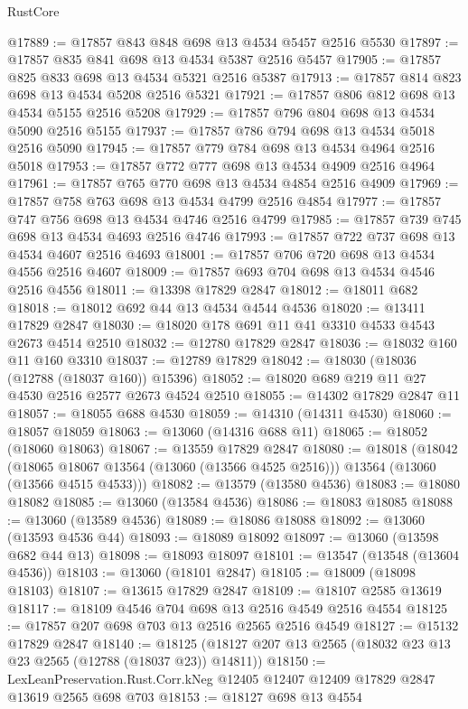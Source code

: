 \begin{lexlean}{RustCore}
\begin{coremodule}
@17889 := @17857 @843 @848 @698 @13 @4534 @5457 @2516 @5530
@17897 := @17857 @835 @841 @698 @13 @4534 @5387 @2516 @5457
@17905 := @17857 @825 @833 @698 @13 @4534 @5321 @2516 @5387
@17913 := @17857 @814 @823 @698 @13 @4534 @5208 @2516 @5321
@17921 := @17857 @806 @812 @698 @13 @4534 @5155 @2516 @5208
@17929 := @17857 @796 @804 @698 @13 @4534 @5090 @2516 @5155
@17937 := @17857 @786 @794 @698 @13 @4534 @5018 @2516 @5090
@17945 := @17857 @779 @784 @698 @13 @4534 @4964 @2516 @5018
@17953 := @17857 @772 @777 @698 @13 @4534 @4909 @2516 @4964
@17961 := @17857 @765 @770 @698 @13 @4534 @4854 @2516 @4909
@17969 := @17857 @758 @763 @698 @13 @4534 @4799 @2516 @4854
@17977 := @17857 @747 @756 @698 @13 @4534 @4746 @2516 @4799
@17985 := @17857 @739 @745 @698 @13 @4534 @4693 @2516 @4746
@17993 := @17857 @722 @737 @698 @13 @4534 @4607 @2516 @4693
@18001 := @17857 @706 @720 @698 @13 @4534 @4556 @2516 @4607
@18009 := @17857 @693 @704 @698 @13 @4534 @4546 @2516 @4556
@18011 := @13398 @17829 @2847
@18012 := @18011 @682
@18018 := @18012 @692 @44 @13 @4534 @4544 @4536
@18020 := @13411 @17829 @2847
@18030 := @18020 @178 @691 @11 @41 @3310 @4533 @4543 @2673 @4514 @2510
@18032 := @12780 @17829 @2847
@18036 := @18032 @160 @11 @160 @3310
@18037 := @12789 @17829
@18042 := @18030 (@18036 (@12788 (@18037 @160)) @15396)
@18052 := @18020 @689 @219 @11 @27 @4530 @2516 @2577 @2673 @4524 @2510
@18055 := @14302 @17829 @2847 @11
@18057 := @18055 @688 @4530
@18059 := @14310 (@14311 @4530)
@18060 := @18057 @18059
@18063 := @13060 (@14316 @688 @11)
@18065 := @18052 (@18060 @18063)
@18067 := @13559 @17829 @2847
@18080 := @18018
    (@18042
      (@18065 @18067 @13564 (@13060 (@13566 @4525 @2516)))
      @13564
      (@13060 (@13566 @4515 @4533)))
@18082 := @13579 (@13580 @4536)
@18083 := @18080 @18082
@18085 := @13060 (@13584 @4536)
@18086 := @18083 @18085
@18088 := @13060 (@13589 @4536)
@18089 := @18086 @18088
@18092 := @13060 (@13593 @4536 @44)
@18093 := @18089 @18092
@18097 := @13060 (@13598 @682 @44 @13)
@18098 := @18093 @18097
@18101 := @13547 (@13548 (@13604 @4536))
@18103 := @13060 (@18101 @2847)
@18105 := @18009 (@18098 @18103)
@18107 := @13615 @17829 @2847
@18109 := @18107 @2585 @13619
@18117 := @18109 @4546 @704 @698 @13 @2516 @4549 @2516 @4554
@18125 := @17857 @207 @698 @703 @13 @2516 @2565 @2516 @4549
@18127 := @15132 @17829 @2847
@18140 := @18125 (@18127 @207 @13 @2565 (@18032 @23 @13 @23 @2565 (@12788 (@18037 @23)) @14811))
@18150 := LexLeanPreservation.Rust.Corr.kNeg
    @12405
    @12407
    @12409
    @17829
    @2847
    @13619
    @2565
    @698
    @703
@18153 := @18127 @698 @13 @4554

\end{coremodule}
\end{lexlean}
